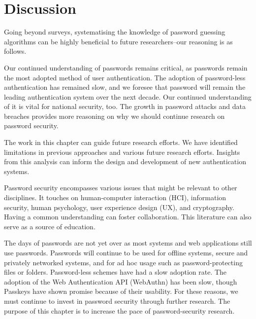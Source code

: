 \section{Discussion}
\label{sec::chp5::discussion}

Going beyond surveys, systematising the knowledge of password guessing algorithms can be highly beneficial to future researchers--our reasoning is as follows.

Our continued understanding of passwords remains critical, as passwords remain the most adopted method of user authentication. The adoption of password-less authentication has remained slow, and we foresee that password will remain the leading authentication system over the next decade. Our continued understanding of it is vital for national security, too. The growth in password attacks and data breaches provides more reasoning on why we should continue research on password security.

The work in this chapter can guide future research efforts. We have identified limitations in previous approaches and various future research efforts. Insights from this analysis can inform the design and development of new authentication systems. 

Password security encompasses various issues that might be relevant to other disciplines. It touches on human-computer interaction (HCI), information security, human psychology, user experience design (UX), and cryptography. Having a common understanding can foster collaboration. This literature can also serve as a source of education.

The days of passwords are not yet over as most systems and web applications still use passwords. Passwords will continue to be used for offline systems, secure and privately networked systems, and for ad hoc usage such as password-protecting files or folders. Password-less schemes have had a slow adoption rate. The adoption of the Web Authentication API (WebAuthn) has been slow, though Passkeys have shown promise because of their usability. For these reasons, we must continue to invest in password security through further research. The purpose of this chapter is to increase the pace of password-security research.

%

